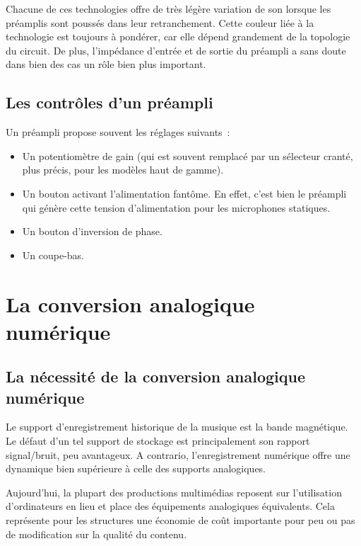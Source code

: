 \documentclass[
]{book}
\providecommand{\tightlist}{%
  \setlength{\itemsep}{0pt}\setlength{\parskip}{0pt}}
\begin{document}
Chacune de ces technologies offre de très légère variation de son lorsque les préamplis sont poussés dans leur retranchement. Cette couleur liée à la technologie est toujours à pondérer, car elle dépend grandement de la topologie du circuit. De plus, l'impédance d'entrée et de sortie du préampli a sans doute dans bien des cas un rôle bien plus important.

\hypertarget{les-contruxf4les-dun-pruxe9ampli}{%
\section{Les contrôles d'un préampli}\label{les-contruxf4les-dun-pruxe9ampli}}

Un préampli propose souvent les réglages suivants~:

\begin{itemize}
\tightlist
\item
  Un potentiomètre de gain (qui est souvent remplacé par un sélecteur cranté, plus précis, pour les modèles haut de gamme).
\item
  Un bouton activant l'alimentation fantôme. En effet, c'est bien le préampli qui génère cette tension d'alimentation pour les microphones statiques.
\item
  Un bouton d'inversion de phase.
\item
  Un coupe-bas.
\end{itemize}

\hypertarget{la-conversion-analogique-numuxe9rique}{%
\chapter{La conversion analogique numérique}\label{la-conversion-analogique-numuxe9rique}}

\hypertarget{la-nuxe9cessituxe9-de-la-conversion-analogique-numuxe9rique}{%
\section{La nécessité de la conversion analogique numérique}\label{la-nuxe9cessituxe9-de-la-conversion-analogique-numuxe9rique}}

Le support d'enregistrement historique de la musique est la bande magnétique. Le défaut d'un tel support de stockage est principalement son rapport signal/bruit, peu avantageux. A contrario, l'enregistrement numérique offre une dynamique bien supérieure à celle des supports analogiques.

Aujourd'hui, la plupart des productions multimédias reposent sur l'utilisation d'ordinateurs en lieu et place des équipements analogiques équivalents. Cela représente pour les structures une économie de coût importante pour peu ou pas de modification sur la qualité du contenu.
\end{document}
